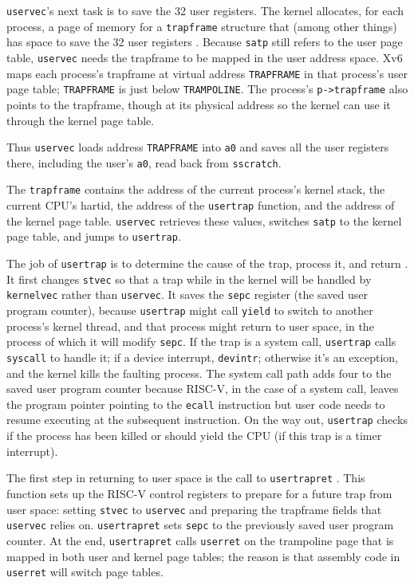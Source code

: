 {\tt uservec}'s next task is to save the 32 user registers.
The kernel allocates, for each process, a page of memory for a
{\tt trapframe} structure that (among other things) has space to
save the 32 user registers
. Because {\tt satp} still
refers to the user page table, {\tt uservec} needs the trapframe to be
mapped in the user address space. Xv6 maps each process's trapframe
at virtual address {\tt TRAPFRAME} in that process's user page table;
{\tt TRAPFRAME} is
just below {\tt TRAMPOLINE}. The process's {\tt p->trapframe} also
points to the
trapframe, though at its physical address so the kernel can use it
through the kernel page table.

Thus {\tt uservec} loads address {\tt TRAPFRAME} into {\tt a0}
and saves all the user registers there,
including the user's {\tt a0}, read back from {\tt sscratch}.

The {\tt trapframe} contains the address of the current process's
kernel stack, the current CPU's hartid, the address of the {\tt usertrap}
function,
and the address of the kernel page table. {\tt uservec}
retrieves these values, switches {\tt satp} to the kernel page table,
and jumps to {\tt usertrap}.

The job of {\tt usertrap} is to determine
the cause of the trap, process it, and return
.
It first changes {\tt stvec} so
that a trap while in the kernel will be handled by
{\tt kernelvec} rather than {\tt uservec}.
It saves the {\tt sepc} register (the saved user program counter),
because 
{\tt usertrap} might call \lstinline{yield} to switch
to another process's kernel thread, and that process might return
to user space, in the process of which it will modify \lstinline{sepc}.
If the trap is a system call, {\tt usertrap} calls {\tt syscall} to
handle it;
if a device interrupt, {\tt devintr};
otherwise it's an exception, and the kernel kills the
faulting process.
The system call path adds four to the saved user program counter
because RISC-V, in the case of a system call,
leaves the program pointer pointing to the {\tt ecall} instruction
but user code needs to resume executing at the subsequent instruction.
On the way out, {\tt usertrap} checks if the process has been
killed or should yield the CPU (if this trap is a timer interrupt).

The first step in returning to user space is the call to {\tt usertrapret}
.
This function sets up the RISC-V control registers to prepare for a
future trap from user space: setting {\tt stvec}
to {\tt uservec} and preparing the trapframe fields that
{\tt uservec} relies on.
{\tt usertrapret} sets {\tt sepc} to the previously
saved user program counter.
At the end, {\tt usertrapret}
calls {\tt userret} on the trampoline page that is mapped in
both user and kernel page tables; the reason is that assembly
code in {\tt userret} will switch page tables.

